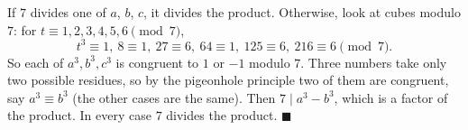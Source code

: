 If $7$ divides one of $a$, $b$, $c$, it divides the product. Otherwise, look at cubes modulo $7$: for $t\equiv1,2,3,4,5,6\pmod7$,
\[
t^3\equiv1,\ 8\equiv1,\ 27\equiv6,\ 64\equiv1,\ 125\equiv6,\ 216\equiv6\pmod 7 .
\]
So each of $a^3,b^3,c^3$ is congruent to $1$ or $-1$ modulo $7$. Three numbers take only two possible residues, so by the pigeonhole principle two of them are congruent, say $a^3\equiv b^3$ (the other cases are the same). Then $7\mid a^3-b^3$, which is a factor of the product. In every case $7$ divides the product. $\blacksquare$
